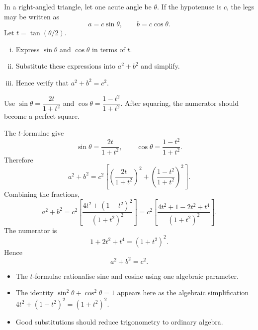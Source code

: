 
\begin{problem}
In a right-angled triangle, let one acute angle be $\theta$. If the hypotenuse
is $c$, the legs may be written as
\[
a=c\sin\theta,
\qquad
b=c\cos\theta.
\]
Let $t=\tan(\theta/2)$.

\begin{enumerate}[(i)]
  \item Express $\sin\theta$ and $\cos\theta$ in terms of $t$.
  \item Substitute these expressions into $a^2+b^2$ and simplify.
  \item Hence verify that $a^2+b^2=c^2$.
\end{enumerate}
\end{problem}

\begin{hintbox}
Use
$\sin\theta=\dfrac{2t}{1+t^2}$ and
$\cos\theta=\dfrac{1-t^2}{1+t^2}$. After squaring, the numerator should become
a perfect square.
\end{hintbox}

\begin{solution}
The $t$-formulae give
\[
\sin\theta=\frac{2t}{1+t^2},
\qquad
\cos\theta=\frac{1-t^2}{1+t^2}.
\]
Therefore
\[
a^2+b^2
=c^2\left[
\left(\frac{2t}{1+t^2}\right)^2+
\left(\frac{1-t^2}{1+t^2}\right)^2
\right].
\]
Combining the fractions,
\[
a^2+b^2
=c^2\left[
\frac{4t^2+(1-t^2)^2}{(1+t^2)^2}
\right]
=c^2\left[
\frac{4t^2+1-2t^2+t^4}{(1+t^2)^2}
\right].
\]
The numerator is
\[
1+2t^2+t^4=(1+t^2)^2.
\]
Hence
\[
a^2+b^2=c^2.
\]
\end{solution}

\begin{takeaways}
\begin{itemize}[leftmargin=*]
  \item The $t$-formulae rationalise sine and cosine using one algebraic
        parameter.
  \item The identity $\sin^2\theta+\cos^2\theta=1$ appears here as the algebraic
        simplification
        $4t^2+(1-t^2)^2=(1+t^2)^2$.
  \item Good substitutions should reduce trigonometry to ordinary algebra.
\end{itemize}
\end{takeaways}

